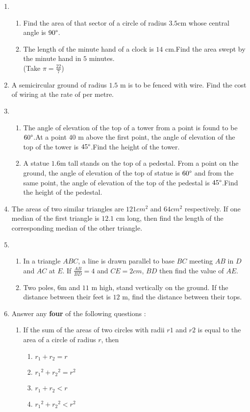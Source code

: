 \documentclass{article}
\begin{document}
\begin{enumerate}
\item 
\begin{enumerate}
    \item Find the area of that sector of a circle of radius 
    $3.5$cm whose central angle is $90\degree$.
    \item The length of the minute hand of a clock is $14$ cm.Find the area swept by the minute hand in $5$ minutes.\\
	    (Take $\pi = \frac{22}{7}$)
\end{enumerate}
\item A semicircular ground of radius $1.5$ m is to be fenced with wire. Find the cost of wiring at the rate of  per metre.
\item 
\begin{enumerate}
    \item The angle of elevation of the top of a tower from a point is found to be $60\degree$.At a point $40$ m above the first point, the angle of elevation of the top of the tower is $45\degree$.Find the height of the tower.
    \item A statue $1.6$m tall stands on the top of a pedestal. From a point on the ground, the angle of elevation of the top of statue is $60\degree$ and from the same point, the angle of elevation of the top of the pedestal is $45\degree$.Find the height of the pedestal.
\end{enumerate}
\item The areas of two similar triangles are $121 cm^2$ and $64cm^2$ respectively. If one median of the first triangle is $12.1$ cm long, then find the length of the corresponding median of the other triangle.
\item 
\begin{enumerate}
    \item In a triangle $ABC$, a line is drawn parallel to base $BC$ meeting $AB$ in $D$ and $AC$ at $E$. If $\frac{AB}{BD} = 4$ and $CE = 2 cm$, $BD$ then find the value of $AE$.
    \item Two poles, $6$m and $11$ m high, stand vertically on the ground. If the distance between their feet is $12$ m, find the distance between their tops.
\end{enumerate}
\item Answer any \textbf{four} of the following questions :
\begin{enumerate}[label=(\roman*)]

    \item If the sum of the areas of two circles with radii $r1$ and $r2$ is equal to the area of a circle of radius $r$, then
    \begin{enumerate} [label=(\Alph*)]
        \item $r_1+r_2=r$
        \item ${r_1}^2+{r_2}^2=r^2$
        \item $r_1+r_2< r$
        \item ${r_1}^2+{r_2}^2 < r^2$
\end{enumerate} 


\end{enumerate}
\end{enumerate}
\end{document}
